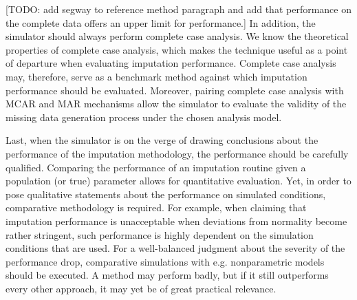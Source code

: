 \documentclass[bimj,fleqn]{w-art}
\begin{document}
[TODO: add segway to reference method paragraph and add that performance on the complete data offers an upper limit for performance.] In addition, the simulator should always perform complete case analysis. We know the theoretical properties of complete case analysis, which makes the technique useful as a point of departure when evaluating imputation performance. Complete case analysis may, therefore, serve as a benchmark method against which imputation performance should be evaluated. Moreover, pairing complete case analysis with MCAR and MAR mechanisms allow the simulator to evaluate the validity of the missing data generation process under the chosen analysis model.












Last, when the simulator is on the verge of drawing conclusions about the performance of the imputation methodology, the performance should be carefully qualified. Comparing the performance of an imputation routine given a population (or true) parameter allows for quantitative evaluation. Yet, in order to pose qualitative statements about the performance on simulated conditions, comparative methodology is required. For example, when claiming that imputation performance is unacceptable when deviations from normality become rather stringent, such performance is highly dependent on the simulation conditions that are used. For a well-balanced judgment about the severity of the performance drop, comparative simulations with e.g. nonparametric models should be executed. A method may perform badly, but if it still outperforms every other approach, it may yet be of great practical relevance.

\end{document}
